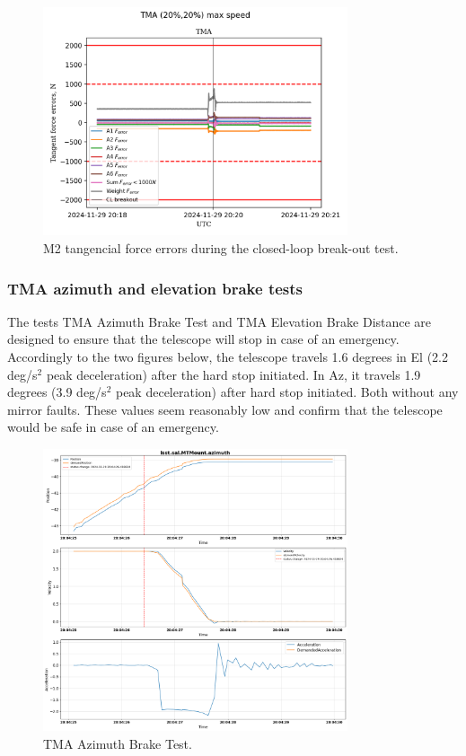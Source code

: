 \begin{figure}
    \centering
    \includegraphics[width=0.8\textwidth]{spa/20_vel_acc_jerk/BLOCK-T241_m2_tangent_force_errors.png}
    \caption{M2 tangencial force errors during the closed-loop break-out test.}
    \label{fig:block241_m2_tangent_force_errors}
    \end{figure}


\subsubsection{TMA azimuth and elevation brake tests}
\label{subsubsec:tma_azimuth_and_elevation_brake_tests}

The tests  TMA Azimuth Brake Test and
 TMA Elevation Brake Distance are designed to ensure that the
telescope will stop in case of an emergency. Accordingly to the two figures below,
the telescope travels 1.6 degrees in El (2.2 deg/s$^2$ peak deceleration) after the hard stop initiated.
In Az, it travels 1.9 degrees (3.9 deg/s$^2$ peak deceleration) after hard stop initiated.
Both without any mirror faults. These values seem reasonably low and confirm that the telescope
would be safe in case of an emergency.

\begin{figure}
    \centering
    \includegraphics[width=0.8\textwidth]{spa/20_vel_acc_jerk/BLOCK-T231_az_brake_tests.png}
    \caption{TMA Azimuth Brake Test.}
    \label{fig:block231_azimuth_brake_test}
    \end{figure}

